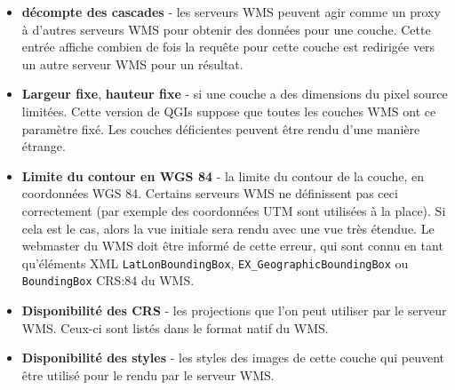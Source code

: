 \begin{itemize}
\begin{itemize}
\item \textbf{décompte des cascades}    - les serveurs WMS peuvent agir comme
un proxy à d'autres serveurs WMS pour obtenir des données pour une couche.
Cette entrée affiche combien de fois la requête pour cette couche est
redirigée vers un autre serveur WMS pour un résultat.

\item \textbf{Largeur fixe}, \textbf{hauteur fixe}     - si une couche a
des dimensions du pixel source limitées. Cette version de QGIs suppose que
toutes les couches WMS ont ce paramètre fixé. Les couches déficientes  peuvent
être rendu d'une manière étrange.

\item \textbf{Limite du contour en WGS 84} - la limite du contour de la
couche, en coordonnées WGS 84. Certains serveurs WMS ne définissent pas ceci
correctement (par exemple des coordonnées UTM sont utilisées à la place). Si
cela est le cas, alors la vue initiale sera rendu avec une vue très étendue. Le
webmaster du WMS doit être informé de cette erreur, qui sont connu en tant
qu'éléments XML \texttt{LatLonBoundingBox}, \texttt{EX\_GeographicBoundingBox}
ou \texttt{BoundingBox} CRS:84 du WMS.

\item \textbf{Disponibilité des CRS} - les projections que l'on peut utiliser
par le serveur WMS. Ceux-ci sont listés dans le format natif du WMS.

\item \textbf{Disponibilité des styles} - les styles des images de cette couche
qui peuvent être utilisé pour le rendu par le serveur WMS.

\end{itemize}

\end{itemize}


